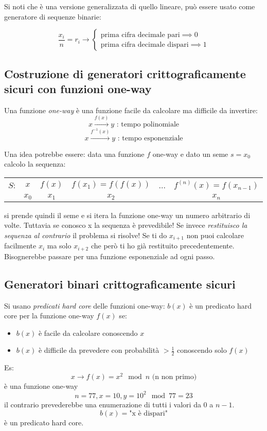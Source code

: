 Si noti che è una versione generalizzata di quello lineare, può essere usato come generatore di sequenze binarie:

\begin{equation}
    \frac{x_{i}}{n} = r_{i} \longrightarrow
    \begin{cases}
        \text{prima cifra decimale pari} \implies 0 \\
        \text{prima cifra decimale dispari} \implies 1
    \end{cases}
\end{equation}

\subsection{Costruzione di generatori crittograficamente sicuri con funzioni one-way}
Una funzione \emph{one-way} è una funzione facile da calcolare ma difficile da invertire:
$$ x \xrightarrow{f(x)} y \text{ : tempo polinomiale} $$
$$ x \xrightarrow{f^{-1}(x)} y \text{ : tempo esponenziale} $$

Una idea potrebbe essere: data una funzione $f$ one-way e dato un seme $s = x_{0}$ calcolo la sequenza:
\begin{table}[!ht]
    \centering
    \begin{tabular}{c | c c c c c}
        $S$: & $x$ & $f(x)$ & $f(x_{1}) = f(f(x))$ & ... & $f^{(n)}(x) = f(x_{n-1})$ \\
         & $x_{0}$ & $x_{1}$ & $x_{2}$ & & $x_{n}$ \\
    \end{tabular}
\end{table}

si prende quindi il seme e si itera la funzione one-way un numero arbitrario di volte. Tuttavia se conosco x la sequenza è prevedibile! Se invece \emph{restituisco la sequenza al contrario} il problema si risolve! Se ti do $x_{i+1}$ non puoi calcolare facilmente $x_{i}$ ma solo $x_{i+2}$ che però ti ho già restituito precedentemente. Bisognerebbe passare per una funzione esponenziale ad ogni passo.

\subsection{Generatori binari crittograficamente sicuri}
Si usano \emph{predicati hard core} delle funzioni one-way: $b(x)$ è un predicato hard core per la funzione one-way $f(x)$ se:
\begin{itemize}
    \item $b(x)$ è facile da calcolare conoscendo $x$
    \item $b(x)$ è difficile da prevedere con probabilità $> \frac{1}{2}$ conoscendo solo $f(x)$
\end{itemize}
Es:
$$ x \xrightarrow{} f(x) = x^2 \mod n \text{ (n non primo)} $$
è una funzione one-way
$$ n = 77, x = 10, y = 10^{2} \mod 77 = 23 $$
il contrario prevederebbe una enumerazione di tutti i valori da 0 a $n-1$.
$$ b(x) = \text{"x è dispari"} $$
è un predicato hard core.

